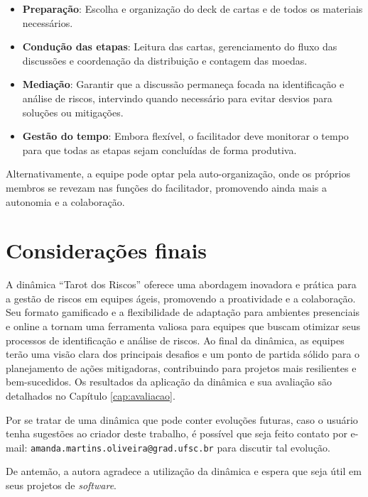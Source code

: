 \documentclass[
	12pt,
	openright,
	twoside,
	a4paper,
	english,
	brazil
	]{abntex2}
\begin{document}
\begin{itemize}
  \item \textbf{Preparação}: Escolha e organização do deck de cartas e de todos os materiais necessários.
  \item \textbf{Condução das etapas}: Leitura das cartas, gerenciamento do fluxo das discussões e coordenação da distribuição e contagem das moedas.
  \item \textbf{Mediação}: Garantir que a discussão permaneça focada na identificação e análise de riscos, intervindo quando necessário para evitar desvios para soluções ou mitigações.
  \item \textbf{Gestão do tempo}: Embora flexível, o facilitador deve monitorar o tempo para que todas as etapas sejam concluídas de forma produtiva.
\end{itemize}

Alternativamente, a equipe pode optar pela auto-organização, onde os próprios membros se revezam nas funções do facilitador, promovendo ainda mais a autonomia e a colaboração.

\section{Considerações finais}
\label{sec:consideracoes-finais-cap5}

A dinâmica “Tarot dos Riscos” oferece uma abordagem inovadora e prática para a gestão de riscos em equipes ágeis, promovendo a proatividade e a colaboração. Seu formato gamificado e a flexibilidade de adaptação para ambientes presenciais e online a tornam uma ferramenta valiosa para equipes que buscam otimizar seus processos de identificação e análise de riscos. Ao final da dinâmica, as equipes terão uma visão clara dos principais desafios e um ponto de partida sólido para o planejamento de ações mitigadoras, contribuindo para projetos mais resilientes e bem-sucedidos. Os resultados da aplicação da dinâmica e sua avaliação são detalhados no Capítulo \ref{cap:avaliacao}.

Por se tratar de uma dinâmica que pode conter evoluções futuras, caso o usuário tenha sugestões ao criador deste trabalho, é possível que seja feito contato por e-mail: \texttt{amanda.martins.oliveira@grad.ufsc.br} para discutir tal evolução. %

De antemão, a autora agradece a utilização da dinâmica e espera que seja útil em seus projetos de \textit{software}.
\end{document}
